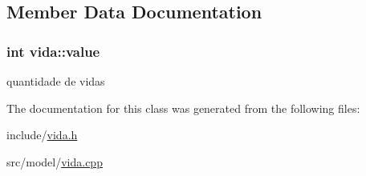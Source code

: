 \subsection{Member Data Documentation}
\subsubsection[{\texorpdfstring{value}{value}}]{\setlength{\rightskip}{0pt plus 5cm}int vida\+::value\hspace{0.3cm}{\ttfamily [private]}}\hypertarget{classvida_ae9dec2f5055b4b7b7a67be0d3c344ba4}{}\label{classvida_ae9dec2f5055b4b7b7a67be0d3c344ba4}
quantidade de vidas 

The documentation for this class was generated from the following files\+:\begin{DoxyCompactItemize}
\item 
include/\hyperlink{vida_8h}{vida.\+h}\item 
src/model/\hyperlink{vida_8cpp}{vida.\+cpp}\end{DoxyCompactItemize}
